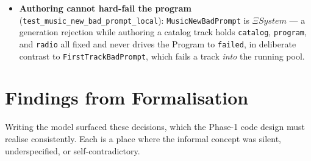 \documentclass[a4paper,10pt,fleqn]{article}
\begin{document}
\begin{itemize}
    \texttt{genTarget} coupling invariant. Together they are the model's ``in the
    pool of a playing-or-generating Program, or being generated into'' backing
    set, matching the implementation's
    \texttt{advances\_on\_end OR wants\_generation}.
  \item \textbf{Authoring cannot hard-fail the program}
    (\texttt{test\_music\_new\_bad\_prompt\_local}): \texttt{MusicNewBadPrompt}
    is \texttt{$\Xi System$} --- a generation rejection while authoring a catalog
    track holds \texttt{catalog}, \texttt{program}, and \texttt{radio} all fixed
    and never drives the Program to \texttt{failed}, in deliberate contrast to
    \texttt{FirstTrackBadPrompt}, which fails a track \emph{into} the running
    pool.
\end{itemize}

\section{Findings from Formalisation}
\label{sec:findings}

Writing the model surfaced these decisions, which the Phase-1 code design must
realise consistently. Each is a place where the informal concept was silent,
underspecified, or self-contradictory.
\end{document}
